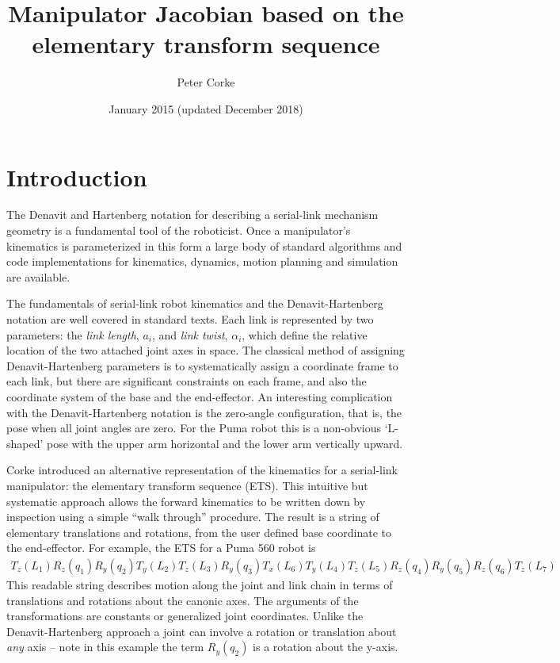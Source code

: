 \documentclass[11pt]{article}
\title{Manipulator Jacobian based on the elementary transform sequence}
\author{Peter Corke}
\date{January 2015 (\small updated December 2018)}                                           %
\begin{document}
\maketitle

\section{Introduction}
The Denavit and Hartenberg notation for describing a serial-link mechanism
geometry is a fundamental tool of the roboticist.
Once a manipulator's kinematics is parameterized in this form a large body
of standard algorithms and code implementations for
kinematics, dynamics, motion planning and simulation are available\cite{Corke17a}.

The fundamentals of serial-link robot kinematics and the 
Denavit-Hartenberg\cite{Hartenberg55} notation are well covered in
standard texts\cite{Spong06,Paul81a}.  Each link is represented by
two parameters: the
{\em link length}, $a_i$, and {\em link twist}, $\alpha_i$, which define 
the relative location of the two attached joint axes in space.
The classical method of assigning Denavit-Hartenberg parameters is to 
systematically assign a coordinate frame to each link, but there are
significant constraints on each frame, and also the coordinate system
of the base and the end-effector.
An interesting complication with the Denavit-Hartenberg notation is the
zero-angle configuration, that is, the pose when all joint angles are zero.
For the Puma robot this is a non-obvious `L-shaped' pose with the upper
arm horizontal and the lower arm vertically upward.

Corke\cite{Corke07a} introduced an alternative representation of the kinematics for a serial-link manipulator: the elementary transform sequence (ETS).
This intuitive but systematic approach allows the forward kinematics to be written down by inspection
using a simple ``walk through'' procedure.
The result is a string of elementary translations and rotations, from
the user defined base coordinate to the end-effector.
For example, the ETS for a Puma 560 robot is 
\begin{align*}
T_z(L_1) R_z(q_1) R_y(q_2) T_y(L_2) T_z(L_3) R_y(q_3) T_x(L_6) T_y(L_4) 
T_z(L_5) R_z(q_4) R_y(q_5) R_z(q_6) T_z(L_7) & \label{eq:puma}
\end{align*}
This readable string describes motion along the joint and link chain in terms of translations and rotations
about the canonic axes.  The arguments of the transformations are constants or generalized joint coordinates.
Unlike the Denavit-Hartenberg approach a joint can involve a rotation or translation about \textit{any} axis -- note in this
example the term $R_y(q_2)$ is a rotation about the y-axis.
\end{document}

